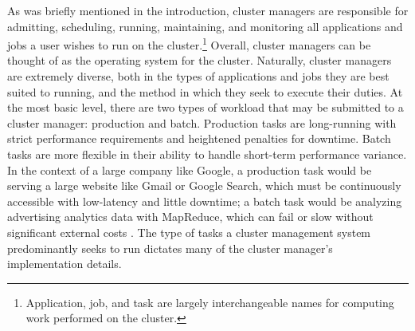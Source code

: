 As was briefly mentioned in the introduction, cluster managers are responsible
for admitting, scheduling, running, maintaining, and monitoring all applications
and jobs a user wishes to run on the cluster.\footnote{Application, job, and
task are largely interchangeable names for computing work performed on the
cluster.} Overall, cluster managers can be thought of as the
operating system for the cluster. Naturally, cluster managers are
extremely diverse, both in the types of applications and jobs they are best
suited to running, and the method in which they seek to execute their duties.
At the most basic level, there are two types of workload that may be submitted
to a cluster manager: production and batch. Production tasks are long-running
with strict performance requirements and heightened penalties for downtime. Batch tasks are
more flexible in their ability to handle short-term performance variance. In the
context of a large company like Google, a production task would be serving a
large website like Gmail or Google Search, which must be continuously
accessible with low-latency
and little downtime; a batch task would be analyzing advertising analytics data
with MapReduce, which can fail or slow without significant external
costs \cite{borg}. The type of tasks a cluster management system
predominantly seeks to run dictates many of the cluster manager's implementation details.


